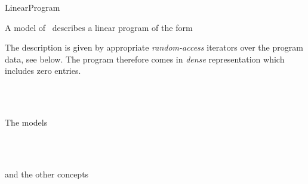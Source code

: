 \begin{ccRefConcept}{LinearProgram}

\ccDefinition
A model of \ccRefName\ describes a linear program of the form


The description is given by appropriate \emph{random-access} 
iterators over the program data, see below. The program therefore 
comes in \emph{dense} representation which includes zero entries.

\ccHasModels
{}\\
\\


\ccTypes







\ccOperations








\ccSeeAlso
The  models 

\\
\\

and the other concepts

\\
\\
\end{ccRefConcept}
